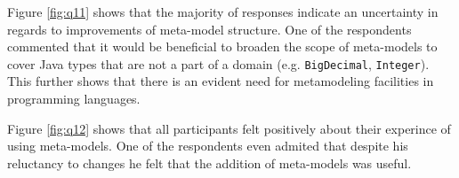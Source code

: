 \noindent Figure \ref{fig:q11} shows that the majority of responses indicate an uncertainty in regards to improvements of meta-model structure.
One of the respondents commented that it would be beneficial to broaden the scope of meta-models to cover Java types that are not a part of a domain (e.g. \texttt{BigDecimal}, \texttt{Integer}).
This further shows that there is an evident need for metamodeling facilities in programming languages.

\noindent Figure \ref{fig:q12} shows that all participants felt positively about their experince of using meta-models.
One of the respondents even admited that despite his reluctancy to changes he felt that the addition of meta-models was useful.
